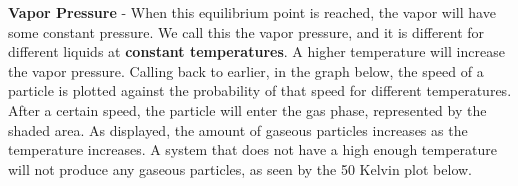 \documentclass{article}
\begin{document}
\vspace{15pt}

\pagebreak

\noindent\textbf{Vapor Pressure} - When this equilibrium point is reached, the vapor will have some constant pressure. We call this the vapor pressure, and it is different for different liquids at \textbf{constant temperatures}. A higher temperature will increase the vapor pressure. Calling back to earlier, in the graph below, the speed of a particle is plotted against the probability of that speed for different temperatures. After a certain speed, the particle will enter the gas phase, represented by the shaded area. As displayed, the amount of gaseous particles increases as the temperature increases. A system that does not have a high enough temperature will not produce any gaseous particles, as seen by the 50 Kelvin plot below.
\end{document}

